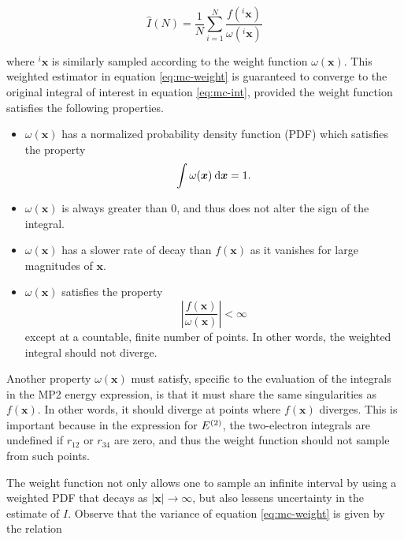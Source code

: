 \begin{equation}
	\hat I(N) = \frac{1}{N} \sum_{i = 1}^N \frac{f(^i \bm x)}{\omega(^i \bm x)}
	\label{eq:mc-weight}
\end{equation}

\noindent where $^i\bm x$ is similarly sampled according to the weight function
$\omega(\bm x)$. This weighted estimator in equation \ref{eq:mc-weight} is
guaranteed to converge to the original integral of interest in equation
\ref{eq:mc-int}, provided the weight function satisfies the following properties.
\cite{mc-book}

\begin{itemize}
	\item $\omega(\bm x)$ has a normalized probability density function (PDF)
		which satisfies the property
		\begin{equation} \int \omega(\bm x) \dif \bm x = 1. \end{equation}

	\item  $\omega(\bm x)$ is always greater than 0, and thus does not alter
		the sign of the integral.

	\item $\omega(\bm x)$ has a slower rate of decay than $f(\bm x)$
		as it vanishes for large magnitudes of $\bm x$.

	\item $\omega(\bm x)$ satisfies the property
		\begin{equation} \left|\frac{f(\bm x)}{\omega(\bm x)}\right| < \infty \end{equation}
		except at a countable, finite number of points. In other words,
		the weighted integral should not diverge.
\end{itemize}

Another property $\omega(\bm x)$ must satisfy, specific to the evaluation of the
integrals in the MP2 energy expression, is that it must share the same
singularities as $f(\bm x)$. In other words, it should diverge at points where
$f(\bm x)$ diverges. This is important because in the expression for
$\perturbE[]{2}$, the two-electron integrals are undefined if $r_{12}$ or
$r_{34}$ are zero, and thus the weight function should not sample from such
points.

The weight function not only allows one to sample an infinite interval by using
a weighted PDF that decays as $|\bm x| \rightarrow \infty$, but also lessens
uncertainty in the estimate of $I$. Observe that the variance of
equation \ref{eq:mc-weight} is given by the relation

